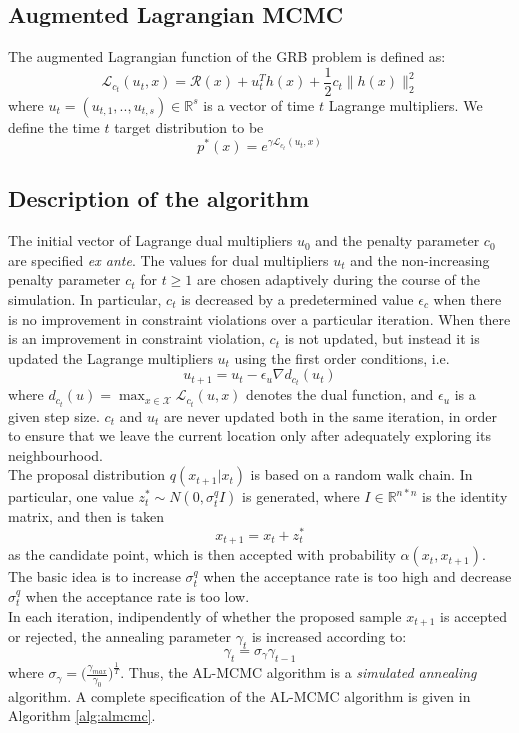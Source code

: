 {\subsection{Augmented Lagrangian MCMC}
The augmented Lagrangian function of the GRB problem is defined as:
\begin{equation}
\mathcal{L}_{c_t}(u_t, x) = \mathcal{R}(x) + u_t^T h(x) + \frac{1}{2} c_t \parallel h(x) \parallel^2_2
\end{equation}
where $u_t = (u_{t,1},..,u_{t,s}) \in \mathbb{R}^s$  is a vector of time $t$ Lagrange multipliers. We define the time $t$ target distribution to be
\begin{equation}
p^*(x) = e^{\gamma \mathcal{L}_{c_t}(u_t, x)}
\end{equation}

\subsection{Description of the algorithm}
The initial vector of Lagrange dual multipliers $u_0$ and the penalty parameter $c_0$ are specified \textit{ex ante}. The values for dual multipliers $u_t$ and the non-increasing penalty parameter $c_t$ for $t\geq 1$ are chosen adaptively during the course of the simulation. In particular, $c_t$ is decreased by
a predetermined value $\epsilon_c$ when there is no improvement in constraint violations over a particular iteration. When there is an improvement in constraint violation, $c_t$ is not updated, but instead it is updated the Lagrange multipliers $u_t$ using the first order conditions, i.e.
\begin{equation}
u_{t+1} = u_t - \epsilon_u \nabla d_{c_t}(u_t)
\end{equation}
where $d_{c_t}(u) = \max_{x \in \mathcal{X}}\mathcal{L}_{c_t}(u, x) $ denotes the dual function, and $\epsilon_u$ is a given step size. $c_t$ and $u_t$ are never updated both in the same iteration, in order to ensure that we leave the current location only after adequately exploring its neighbourhood.\\
The proposal distribution $q(x_{t+1}|x_t)$ is based on a random
walk chain. In particular, one value $z^*_t \sim N(0, \sigma^q_t I )$ is generated, where $I \in \mathbb{R}^{n*n}$ is the identity matrix, and then is taken
\begin{equation}
x_{t+1} = x_t + z_t^*
\end{equation}
as the candidate point, which is then accepted with probability $\alpha(x_t, x_{t+1})$. The basic idea is to increase $\sigma^q_t$ when the acceptance rate is too high and decrease $\sigma^q_t$ when the acceptance rate is too low.\\
In each iteration, indipendently of whether the proposed sample $x_{t+1}$ is accepted or rejected, the annealing parameter $\gamma_t$ is increased according to:
\begin{equation}
\gamma_t = \sigma_{\gamma}\gamma_{t-1}
\end{equation}
where $\sigma_{\gamma} = \big(\frac{\gamma_{max}}{\gamma_0}\big)^{\frac{1}{T}}$. Thus, the AL-MCMC algorithm is a \textit{simulated annealing} algorithm. A complete specification of the AL-MCMC algorithm is given in Algorithm \ref{alg:almcmc}.

}
